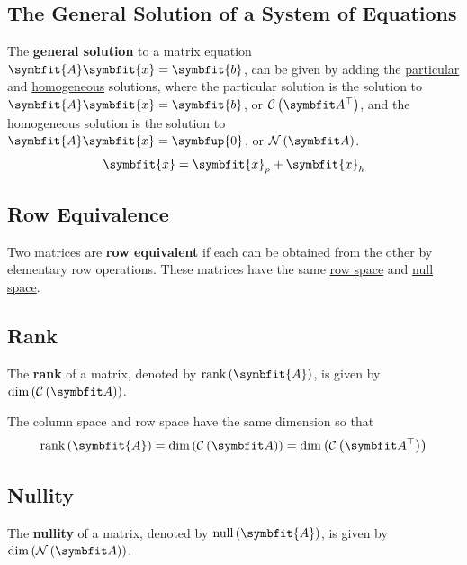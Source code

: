 \documentclass{article}
\begin{document}
\subsection{The General Solution of a System of Equations}
\begin{theorem}
    The \textbf{general solution} to a matrix equation
    \(\symbfit{A}\symbfit{x}=\symbfit{b}\), can be given by adding the
    \underline{particular} and \underline{homogeneous} solutions, where
    the particular solution is the solution to
    \(\symbfit{A}\symbfit{x}=\symbfit{b}\), or \(\rowspace{A}\), and the
    homogeneous solution is the solution to
    \(\symbfit{A}\symbfit{x}=\symbfup{0}\), or \(\nullspace{A}\).
    \begin{equation*}
        \symbfit{x} = \symbfit{x}_p + \symbfit{x}_h
    \end{equation*}
\end{theorem}
\subsection{Row Equivalence}
\begin{definition}
    Two matrices are \textbf{row equivalent} if each can be obtained
    from the other by elementary row operations. These matrices have the
    same \underline{row space} and \underline{null space}.
\end{definition}
\subsection{Rank}
\begin{definition}
    The \textbf{rank} of a matrix, denoted by
    \(\rank{\left( \symbfit{A} \right)}\), is given by
    \(\dim{\left( \columnspace{A} \right)}\).
\end{definition}
\begin{theorem}
    The column space and row space have the same dimension so that
    \begin{equation*}
        \rank{\left( \symbfit{A} \right)}=\dim{\left( \columnspace{A} \right)}=\dim{\left( \rowspace{A} \right)}
    \end{equation*}
\end{theorem}
\subsection{Nullity}
\begin{definition}
    The \textbf{nullity} of a matrix, denoted by
    \(\vnull{\left( \symbfit{A} \right)}\), is given by
    \(\dim{\left( \nullspace{A} \right)}\).
\end{definition}
\newpage
\end{document}
